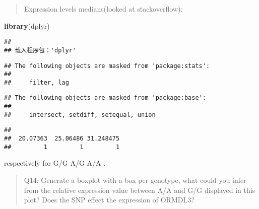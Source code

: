 \documentclass[
]{article}
\newenvironment{Shaded}{\begin{snugshade}}{\end{snugshade}}
\newcommand{\AttributeTok}[1]{\textcolor[rgb]{0.13,0.29,0.53}{#1}}
\newcommand{\ConstantTok}[1]{\textcolor[rgb]{0.56,0.35,0.01}{#1}}
\newcommand{\FunctionTok}[1]{\textcolor[rgb]{0.13,0.29,0.53}{\textbf{#1}}}
\newcommand{\NormalTok}[1]{#1}
\newcommand{\OtherTok}[1]{\textcolor[rgb]{0.56,0.35,0.01}{#1}}
\newcommand{\SpecialCharTok}[1]{\textcolor[rgb]{0.81,0.36,0.00}{\textbf{#1}}}
\begin{document}
\begin{quote}
Expression levels medians(looked at stackoverflow):
\end{quote}

\begin{Shaded}
\begin{Highlighting}[]
\FunctionTok{library}\NormalTok{(dplyr)}
\end{Highlighting}
\end{Shaded}

\begin{verbatim}
## 
## 载入程序包：'dplyr'
\end{verbatim}

\begin{verbatim}
## The following objects are masked from 'package:stats':
## 
##     filter, lag
\end{verbatim}

\begin{verbatim}
## The following objects are masked from 'package:base':
## 
##     intersect, setdiff, setequal, union
\end{verbatim}

\begin{Shaded}
\end{Shaded}

\begin{verbatim}
## 
##  20.07363  25.06486 31.248475 
##         1         1         1
\end{verbatim}

respectively for G/G A/G A/A .

\begin{quote}
Q14: Generate a boxplot with a box per genotype, what could you infer
from the relative expression value between A/A and G/G displayed in this
plot? Does the SNP effect the expression of ORMDL3?
\end{quote}
\end{document}
